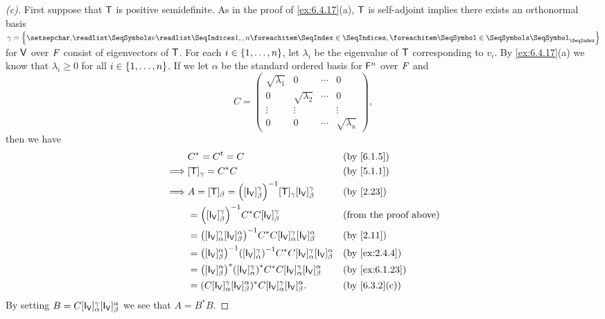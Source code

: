 \begin{proof}[(c)]
	First suppose that \(\mathsf{T}\) is positive semidefinite.
	As in the proof of \cref{ex:6.4.17}(a), \(\mathsf{T}\) is self-adjoint implies there exists an orthonormal basis \(\gamma = \set{\seq{v}{1,,n}}\) for \(\mathsf{V}\) over \(\mathit{F}\) consist of eigenvectors of \(\mathsf{T}\).
	For each \(i \in \left\lbrace1, \dots, n\right\rbrace\), let \(\lambda_i\) be the eigenvalue of \(\mathsf{T}\) corresponding to \(v_i\).
	By \cref{ex:6.4.17}(a) we know that \(\lambda_i \geq 0\) for all \(i \in \left\lbrace1, \dots, n\right\rbrace\).
	If we let \(\alpha\) be the standard ordered basis for \(\mathsf{F}^n\) over \(\mathit{F}\) and
	\[
		C = \begin{pmatrix}
			\sqrt{\lambda_1} & 0                & \cdots & 0                \\
			0                & \sqrt{\lambda_2} & \cdots & 0                \\
			\vdots           & \vdots           &        & \vdots           \\
			0                & 0                & \cdots & \sqrt{\lambda_n}
		\end{pmatrix},
	\]
	then we have
	\begin{align*}
		         & C^* = \tp{C} = C                                                                                                                          &  & \by{6.1.5}                    \\
		\implies & [\T]_{\gamma} = C^* C                                                                                                                     &  & \by{5.1.1}                    \\
		\implies & A = [\T]_{\beta} = \pa{[\IT[\V]]_{\beta}^{\gamma}}^{-1} [\T]_{\gamma} [\IT[\V]]_{\beta}^{\gamma}                                          &  & \by{2.23}                     \\
		         & = \pa{[\IT[\V]]_{\beta}^{\gamma}}^{-1} C^* C [\IT[\V]]_{\beta}^{\gamma}                                                                   &  & \text{(from the proof above)} \\
		         & = \pa{[\IT[\V]]_{\alpha}^{\gamma} [\IT[\V]]_{\beta}^{\alpha}}^{-1} C^* C [\IT[\V]]_{\alpha}^{\gamma} [\IT[\V]]_{\beta}^{\alpha}           &  & \by{2.11}                     \\
		         & = \pa{[\IT[\V]]_{\beta}^{\alpha}}^{-1} \pa{[\IT[\V]]_{\alpha}^{\gamma}}^{-1} C^* C [\IT[\V]]_{\alpha}^{\gamma} [\IT[\V]]_{\beta}^{\alpha} &  & \by{ex:2.4.4}                 \\
		         & = \pa{[\IT[\V]]_{\beta}^{\alpha}}^* \pa{[\IT[\V]]_{\alpha}^{\gamma}}^* C^* C [\IT[\V]]_{\alpha}^{\gamma} [\IT[\V]]_{\beta}^{\alpha}       &  & \by{ex:6.1.23}                \\
		         & = (C [\IT[\V]]_{\alpha}^{\gamma} [\IT[\V]]_{\beta}^{\alpha})^* C [\IT[\V]]_{\alpha}^{\gamma} [\IT[\V]]_{\beta}^{\alpha}.                  &  & \by{6.3.2}[c]
	\end{align*}
	By setting \(B = C [\IT[\V]]_{\alpha}^{\gamma} [\IT[\V]]_{\beta}^{\alpha}\) we see that \(A = B^* B\).


\end{proof}
